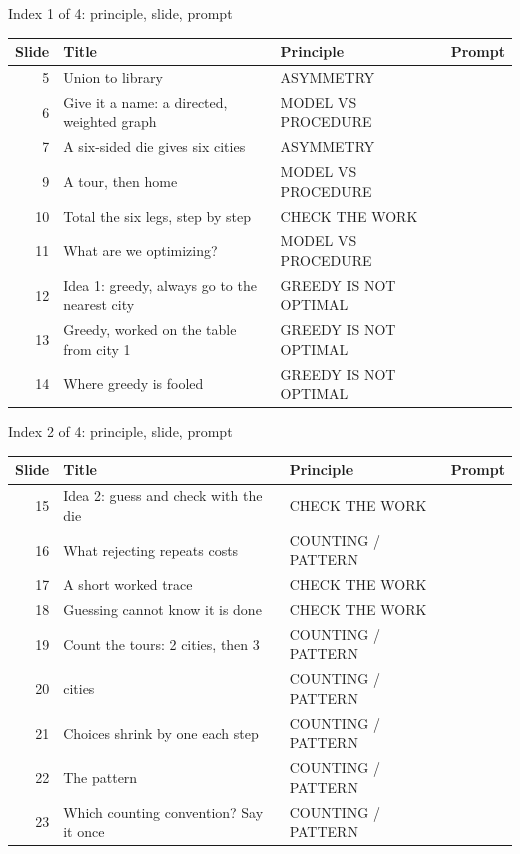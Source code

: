 \begin{frame}{Index 1 of 4: principle, slide, prompt}
\scriptsize
\begin{tabular}{@{}r>{\raggedright\arraybackslash}p{5.4cm}>{\raggedright\arraybackslash}p{4.6cm}p{1.2cm}@{}}
\textbf{Slide} & \textbf{Title} & \textbf{Principle} & \textbf{Prompt}\\\midrule
5 & Union to library & ASYMMETRY & \\
6 & Give it a name: a directed, weighted graph & MODEL VS PROCEDURE & \\
7 & A six-sided die gives six cities & ASYMMETRY & \\
9 & A tour, then home & MODEL VS PROCEDURE & \\
10 & Total the six legs, step by step & CHECK THE WORK & \\
11 & What are we optimizing? & MODEL VS PROCEDURE & \\
12 & Idea 1: greedy, always go to the nearest city & GREEDY IS NOT OPTIMAL & \\
13 & Greedy, worked on the table from city 1 & GREEDY IS NOT OPTIMAL & \\
14 & Where greedy is fooled & GREEDY IS NOT OPTIMAL & \\
\end{tabular}
\end{frame}
\begin{frame}{Index 2 of 4: principle, slide, prompt}
\scriptsize
\begin{tabular}{@{}r>{\raggedright\arraybackslash}p{5.4cm}>{\raggedright\arraybackslash}p{4.6cm}p{1.2cm}@{}}
\textbf{Slide} & \textbf{Title} & \textbf{Principle} & \textbf{Prompt}\\\midrule
15 & Idea 2: guess and check with the die & CHECK THE WORK & \\
16 & What rejecting repeats costs & COUNTING / PATTERN & \\
17 & A short worked trace & CHECK THE WORK & \\
18 & Guessing cannot know it is done & CHECK THE WORK & \\
19 & Count the tours: 2 cities, then 3 & COUNTING / PATTERN & \\
20 & 4 cities & COUNTING / PATTERN & \\
21 & Choices shrink by one each step & COUNTING / PATTERN & \\
22 & The pattern & COUNTING / PATTERN & \\
23 & Which counting convention? Say it once & COUNTING / PATTERN & \\
\end{tabular}
\end{frame}

